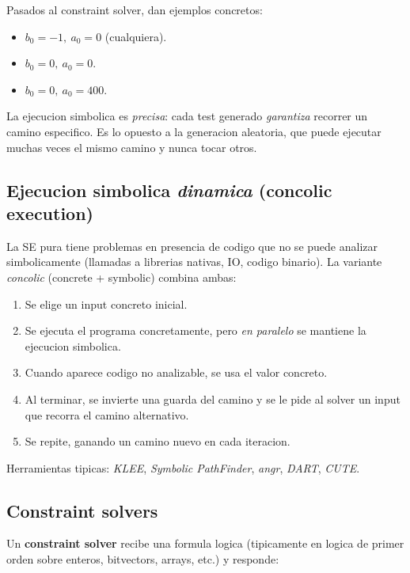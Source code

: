 \documentclass[12pt,a4paper]{article}
\begin{document}
Pasados al constraint solver, dan ejemplos concretos:

\begin{itemize}
  \item $b_0 = -1,\ a_0 = 0$ (cualquiera).
  \item $b_0 = 0,\ a_0 = 0$.
  \item $b_0 = 0,\ a_0 = 400$.
\end{itemize}

\begin{ideabox}
La ejecucion simbolica es \emph{precisa}: cada test generado \emph{garantiza} recorrer un
camino especifico. Es lo opuesto a la generacion aleatoria, que puede ejecutar muchas veces
el mismo camino y nunca tocar otros.
\end{ideabox}

\subsection{Ejecucion simbolica \emph{dinamica} (concolic execution)}

La SE pura tiene problemas en presencia de codigo que no se puede analizar simbolicamente
(llamadas a librerias nativas, IO, codigo binario). La variante \emph{concolic} (concrete +
symbolic) combina ambas:

\begin{enumerate}
  \item Se elige un input concreto inicial.
  \item Se ejecuta el programa concretamente, pero \emph{en paralelo} se mantiene la
  ejecucion simbolica.
  \item Cuando aparece codigo no analizable, se usa el valor concreto.
  \item Al terminar, se invierte una guarda del camino y se le pide al solver un input que
  recorra el camino alternativo.
  \item Se repite, ganando un camino nuevo en cada iteracion.
\end{enumerate}

Herramientas tipicas: \emph{KLEE}, \emph{Symbolic PathFinder}, \emph{angr}, \emph{DART},
\emph{CUTE}.

\subsection{Constraint solvers}

Un \textbf{constraint solver} recibe una formula logica (tipicamente en logica de primer
orden sobre enteros, bitvectors, arrays, etc.) y responde:
\end{document}
